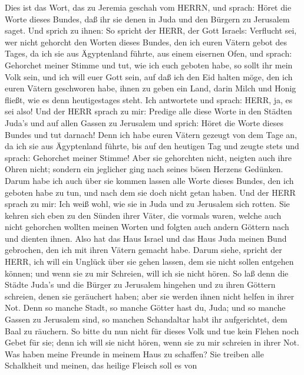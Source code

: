  Dies ist das Wort, das zu Jeremia geschah vom HERRN, und
sprach:  Höret die Worte dieses Bundes, daß ihr sie denen in
Juda und den Bürgern zu Jerusalem saget.  Und sprich zu
ihnen: So spricht der HERR, der Gott Israels: Verflucht sei, wer nicht
gehorcht den Worten dieses Bundes,  den ich euren Vätern
gebot des Tages, da ich sie aus Ägyptenland führte, aus einem eisernen
Ofen, und sprach: Gehorchet meiner Stimme und tut, wie ich euch geboten
habe, so sollt ihr mein Volk sein, und ich will euer Gott sein,
 auf daß ich den Eid halten möge, den ich euren Vätern
geschworen habe, ihnen zu geben ein Land, darin Milch und Honig fließt,
wie es denn heutigestages steht. Ich antwortete und sprach: HERR, ja, es
sei also!  Und der HERR sprach zu mir: Predige alle diese
Worte in den Städten Juda's und auf allen Gassen zu Jerusalem und
sprich: Höret die Worte dieses Bundes und tut darnach!  Denn
ich habe euren Vätern gezeugt von dem Tage an, da ich sie aus
Ägyptenland führte, bis auf den heutigen Tag und zeugte stets und
sprach: Gehorchet meiner Stimme!  Aber sie gehorchten nicht,
neigten auch ihre Ohren nicht; sondern ein jeglicher ging nach seines
bösen Herzens Gedünken. Darum habe ich auch über sie kommen lassen alle
Worte dieses Bundes, den ich geboten habe zu tun, und nach dem sie doch
nicht getan haben.  Und der HERR sprach zu mir: Ich weiß
wohl, wie sie in Juda und zu Jerusalem sich rotten.  Sie
kehren sich eben zu den Sünden ihrer Väter, die vormals waren, welche
auch nicht gehorchen wollten meinen Worten und folgten auch andern
Göttern nach und dienten ihnen. Also hat das Haus Israel und das Haus
Juda meinen Bund gebrochen, den ich mit ihren Vätern gemacht habe.
 Darum siehe, spricht der HERR, ich will ein Unglück über
sie gehen lassen, dem sie nicht sollen entgehen können; und wenn sie zu
mir Schreien, will ich sie nicht hören.  So laß denn die
Städte Juda's und die Bürger zu Jerusalem hingehen und zu ihren Göttern
schreien, denen sie geräuchert haben; aber sie werden ihnen nicht helfen
in ihrer Not.  Denn so manche Stadt, so manche Götter hast
du, Juda; und so manche Gassen zu Jerusalem sind, so manchen Schandaltar
habt ihr aufgerichtet, dem Baal zu räuchern.  So bitte du
nun nicht für dieses Volk und tue kein Flehen noch Gebet für sie; denn
ich will sie nicht hören, wenn sie zu mir schreien in ihrer Not.
 Was haben meine Freunde in meinem Haus zu schaffen? Sie
treiben alle Schalkheit und meinen, das heilige Fleisch soll es von
